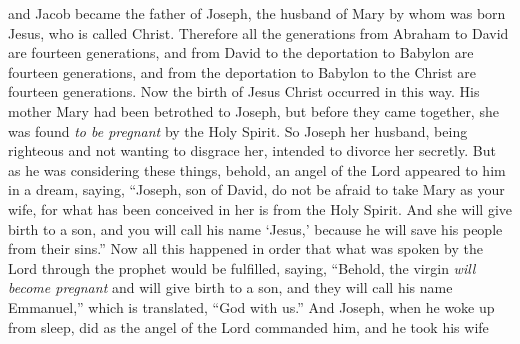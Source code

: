 \begin{biblechapter}
\verse and Jacob became the father of Joseph, the husband of Mary by whom was born Jesus, who is called Christ.
\verse Therefore all the generations from Abraham to David are fourteen generations, and from David to the deportation to Babylon are fourteen generations, and from the deportation to Babylon to the Christ are fourteen generations.
 Now the birth of Jesus Christ occurred in this way. His mother Mary had been betrothed to Joseph, but before they came together, she was found \textit{to be pregnant} by the Holy Spirit.
\verse So Joseph her husband, being righteous and not wanting to disgrace her, intended to divorce her secretly.
\verse But as he was considering these things, behold, an angel of the Lord appeared to him in a dream, saying, “Joseph, son of David, do not be afraid to take Mary as your wife, for what has been conceived in her is from the Holy Spirit.
\verse And she will give birth to a son, and you will call his name ‘Jesus,’ because he will save his people from their sins.”
\verse Now all this happened in order that what was spoken by the Lord through the prophet would be fulfilled, saying,
\verse “Behold, the virgin \textit{will become pregnant} and will give birth to a son, 
and they will call his name Emmanuel,”
\verse which is translated, “God with us.”
\verse And Joseph, when he woke up from sleep, did as the angel of the Lord commanded him, and he took his wife
\end{biblechapter}

